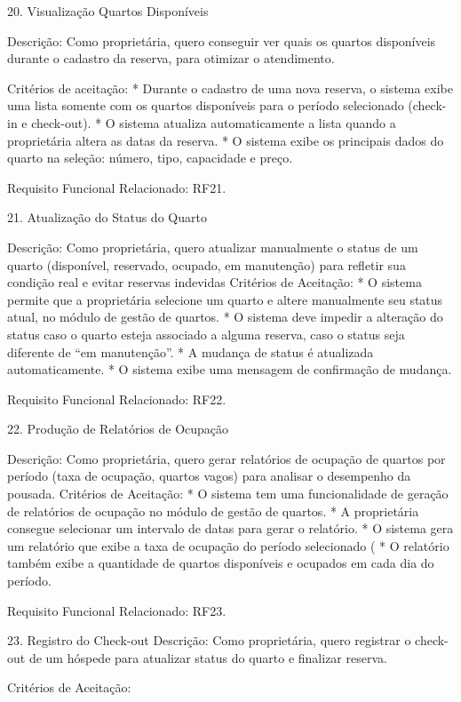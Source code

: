 20. Visualização Quartos Disponíveis


Descrição: Como proprietária, quero conseguir ver quais os quartos disponíveis durante o cadastro da reserva, para otimizar o atendimento.


Critérios de aceitação:
* Durante o cadastro de uma nova reserva, o sistema exibe uma lista somente com os quartos disponíveis para o período selecionado (check-in e check-out).
* O sistema atualiza automaticamente a lista quando a proprietária altera as datas da reserva.
* O sistema exibe os principais dados do quarto na seleção: número, tipo, capacidade e preço.


Requisito Funcional Relacionado: RF21.


21. Atualização do Status do Quarto


Descrição: Como proprietária, quero atualizar manualmente o status de um quarto (disponível, reservado, ocupado, em manutenção) para refletir sua condição real e evitar reservas indevidas
Critérios de Aceitação:
* O sistema permite que a proprietária selecione um quarto e altere manualmente seu status atual, no módulo de gestão de quartos.
* O sistema deve impedir a alteração do status caso o quarto esteja associado a alguma reserva, caso o status seja diferente de “em manutenção”.
* A mudança de status é atualizada automaticamente.
* O sistema exibe uma mensagem de confirmação de mudança.


Requisito Funcional Relacionado: RF22.


22.  Produção de Relatórios de Ocupação


Descrição: Como proprietária, quero gerar relatórios de ocupação de quartos por período (taxa de ocupação, quartos vagos) para analisar o desempenho da pousada.
Critérios de Aceitação:
* O sistema tem uma funcionalidade de geração de relatórios de ocupação no módulo de gestão de quartos.
* A proprietária consegue selecionar um intervalo de datas para gerar o relatório.
* O sistema gera um relatório que exibe a taxa de ocupação do período selecionado (%
* O relatório também exibe a quantidade de quartos disponíveis e ocupados em cada dia do período.


 Requisito Funcional Relacionado: RF23.




23. Registro do Check-out
Descrição: Como proprietária, quero registrar o check-out de um hóspede para atualizar status do quarto e finalizar reserva.


Critérios de Aceitação:

